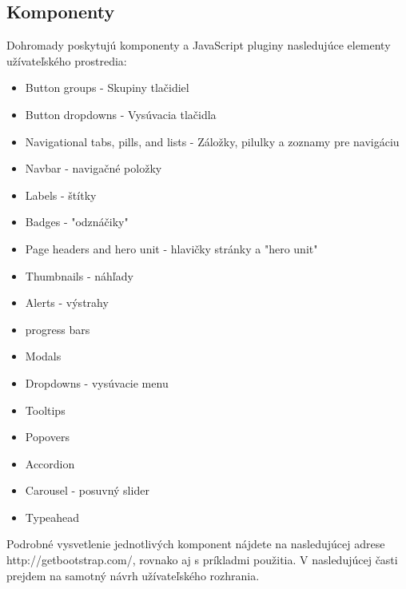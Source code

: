 \subsection{Komponenty}
Dohromady poskytujú komponenty a JavaScript pluginy nasledujúce elementy užívateľského prostredia:
\begin{itemize}
\item Button groups - Skupiny tlačidiel
\item Button dropdowns - Vysúvacia tlačidla
\item Navigational tabs, pills, and lists - Záložky, pilulky a zoznamy pre navigáciu
\item Navbar - navigačné položky
\item Labels - štítky
\item Badges - "odznáčiky"
\item Page headers and hero unit - hlavičky stránky a "hero unit"
\item Thumbnails - náhľady
\item Alerts - výstrahy
\item progress bars
\item Modals
\item Dropdowns - vysúvacie menu
\item Tooltips
\item Popovers
\item Accordion
\item Carousel - posuvný slider
\item Typeahead
\end{itemize}

Podrobné vysvetlenie jednotlivých komponent nájdete na nasledujúcej adrese http://getbootstrap.com/, rovnako aj s príkladmi použitia. V nasledujúcej časti prejdem na samotný návrh užívateľského rozhrania.

